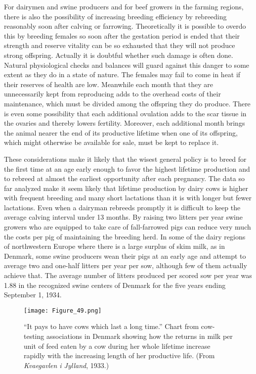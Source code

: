 For dairymen and swine producers and for beef growers in the
farming regions, there is also the possibility of increasing breeding efficiency
by rebreeding reasonably soon after calving or farrowing. Theoretically
it is possible to overdo this by breeding females so soon after
the gestation period is ended that their strength and reserve vitality can
be so exhausted that they will not produce strong offspring. Actually it
is doubtful whether such damage is often done. Natural physiological
checks and balances will guard against this danger to some extent as
they do in a state of nature. The females may fail to come in heat if
their reserves of health are low. Meanwhile each month that they are
unnecessarily kept from reproducing adds to the overhead costs of their
maintenance, which must be divided among the offspring they do produce.
There is even some possibility that each additional ovulation
adds to the scar tissue in the ovaries and thereby lowers fertility. Moreover,
each additional month brings the animal nearer the end of its
productive lifetime when one of its offspring, which might otherwise
be available for sale, must be kept to replace it.

These considerations make it likely that the wisest general policy is
to breed for the first time at an age early enough to favor the highest
lifetime production and to rebreed at almost the earliest opportunity
after each pregnancy. The data so far analyzed make it seem likely that
lifetime production by dairy cows is higher with frequent breeding and
many short lactations than it is with longer but fewer lactations. Even
when a dairyman rebreeds promptly it is difficult to keep the average
calving interval under 13 months. By raising two litters per year swine
growers who are equipped to take care of fall-farrowed pigs can reduce
very much the costs per pig of maintaining the breeding herd. In some
of the dairy regions of northwestern Europe where there is a large surplus
of skim milk, as in Denmark, some swine producers wean their pigs
at an early age and attempt to average two and one-half litters per year
per sow, although few of them actually achieve that. The average number
of litters produced per scored sow per year was 1.88 in the recognized
swine centers of Denmark for the five years ending September 1,
1934.

\begin{figure}
	\centering
    \texttt{[image: Figure\_49.png]}
    \caption{``It pays to have cows which last a long time.'' Chart from cow-testing
			 associations in Denmark showing how the returns in milk per unit of feed eaten by
			 a cow during her whole lifetime increase rapidly with the increasing length of her
			 productive life. (From \textit{Kvaegavlen i Jylland}, 1933.)}
    \label{fig:Lush_Figure_49}
\end{figure}

